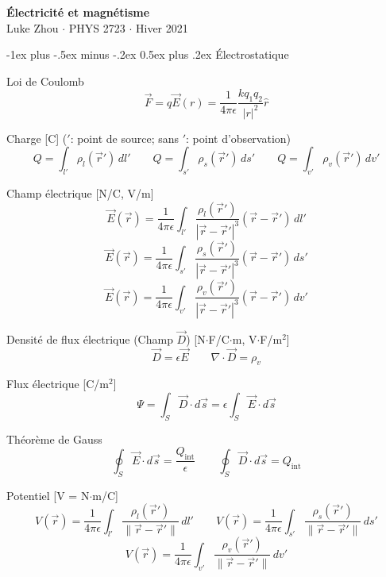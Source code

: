 \documentclass[10pt,landscape]{article}
\makeatletter
\renewcommand{\section}{\@startsection{section}{1}{0mm}%
                                {-1ex plus -.5ex minus -.2ex}%
                                {0.5ex plus .2ex}%
                                {\normalfont\large\bfseries}}
\makeatother
\begin{document}
\raggedright
\footnotesize
\begin{multicols}{3}


\setlength{\premulticols}{1pt}
\setlength{\postmulticols}{1pt}
\setlength{\multicolsep}{1pt}
\setlength{\columnsep}{2pt}

\begin{center}
     \Large{\textbf{Électricité et magnétisme}} \\
     \small{Luke Zhou $\cdot$ PHYS 2723 $\cdot$ Hiver 2021}
\end{center}

\section{Électrostatique}

Loi de Coulomb  
 \[ \vec{F} = q\vec{E}(r) = \frac{1}{4\pi\epsilon} \frac{kq_1q_2}{|r|^2} \hat{r}  \]

Charge  [C] ($'$: point de source; sans $'$: point d'observation)
\[  Q = \int_{l'} \rho_l(\vec{r}') \,dl'  \qquad  Q = \int_{s'} \rho_s(\vec{r}') \,ds'  \qquad Q = \int_{v'} \rho_v(\vec{r}') \,dv'  \]

Champ électrique [N/C, V/m]
\[ \vec{E}(\vec{r}) = \frac{1}{4\pi\epsilon} \int_{l'} \frac{\rho_l(\vec{r}')}{| \vec{r} - \vec{r}' |^3 } (\vec{r} - \vec{r}' )\,dl'  \]
%
\[\vec{E}(\vec{r}) = \frac{1}{4\pi\epsilon} \int_{s'} \frac{\rho_s(\vec{r}')}{| \vec{r} - \vec{r}'|^3 } (\vec{r} - \vec{r}' )\,ds' \]
%
\[\vec{E}(\vec{r}) = \frac{1}{4\pi\epsilon} \int_{v'} \frac{\rho_v(\vec{r}')}{| \vec{r} - \vec{r}' |^3 } (\vec{r} - \vec{r}' )\,dv'  \]

Densité de flux électrique (Champ $\vec{D}$)  [N$\cdot$F/C$\cdot$m, V$\cdot$F/m${}^2$]
\[ \vec{D} = \epsilon\vec{E}
\qquad \nabla \cdot \vec{D} = \rho_v \]

Flux électrique [C/m${}^2$]
\[ \Psi = \int_{S} \vec{D} \cdot d\vec{s} = \epsilon \int_{S} \vec{E} \cdot d\vec{s} \]

Théorème de Gauss
\[ \oint_S \vec{E}\cdot d\vec{s} = \frac{Q_\text{int}}{\epsilon}
\qquad  \oint_S \vec{D}\cdot d\vec{s} = Q_\text{int} \]

Potentiel [V = N$\cdot$m/C]
\[ {V}(\vec{r}) = \frac{1}{4\pi\epsilon} \int_{l'} \frac{\rho_l(\vec{r}')}{\| \vec{r} - \vec{r}' \| } \,dl'
\qquad  {V}(\vec{r}) = \frac{1}{4\pi\epsilon} \int_{s'} \frac{\rho_s(\vec{r}')}{\| \vec{r} - \vec{r}' \| } \,ds'  \]
%
\[ {V}(\vec{r}) = \frac{1}{4\pi\epsilon} \int_{v'} \frac{\rho_v(\vec{r}')}{\| \vec{r} - \vec{r}' \| } \,dv'  \]


\end{multicols}
\end{document}
